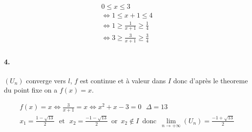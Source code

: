 \documentclass{article}
\begin{document}
\begin{equation*}
\begin{split}
	0 \leq x \leq 3 \\
	\iff 1 \leq x+1 \leq 4 \\
	\iff 1 \geq \frac{1}{x+1} \geq \frac{1}{4} \\
	\iff 3 \geq \frac{3}{x+1} \geq \frac{3}{4} \\
\end{split}
\end{equation*}
\paragraph{4.} $(U_n)$ converge vers $l$, $f$ est continue et à valeur dans $I$ donc d'après le theoreme du point fixe on a $f(x)=x$.

\begin{equation*}
\begin{split}
	f(x)=x \iff  \frac{3}{x+1} = x \iff x^2+x-3 = 0	\,\,\,\, \Delta = 13\\
	x_1 = \frac{1 - \sqrt{13}}{2} \,\,\,\, \text{et} \,\,\,\, x_2 = \frac{-1- \sqrt{13}}{2} \,\,\, \text{or} \,\,\, x_2 \notin I \,\,\, \text{donc} \,\,\, \lim_{n \to + \infty} (U_n) = \frac{-1+\sqrt{13}}{2} 
\end{split}
\end{equation*}
\end{document}
